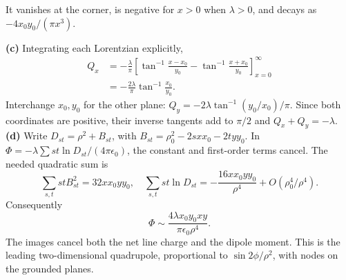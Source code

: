It vanishes at the corner, is negative for $x>0$ when $\lambda>0$,
and decays as $-4x_0y_0/(\pi x^3)$.
\begin{center}
\end{center}
\textbf{(c)} Integrating each Lorentzian explicitly,
\begin{align*}
Q_x&=-\frac\lambda\pi
 \left[\tan^{-1}\frac{x-x_0}{y_0}
       -\tan^{-1}\frac{x+x_0}{y_0}\right]_{x=0}^{\infty}\\
&=\boxed{-\frac{2\lambda}{\pi}\tan^{-1}\frac{x_0}{y_0}}.
\end{align*}
Interchange $x_0,y_0$ for the other plane:
$Q_y=-2\lambda\tan^{-1}(y_0/x_0)/\pi$.
Since both coordinates are positive, their inverse tangents add to
$\pi/2$ and $Q_x+Q_y=-\lambda$.
\textbf{(d)} Write $D_{st}=\rho^2+B_{st}$, with
$B_{st}=\rho_0^2-2sxx_0-2tyy_0$. In
$\Phi=-\lambda\sum st\ln D_{st}/(4\pi\epsilon _0)$,
the constant and first-order terms cancel. The needed quadratic sum is
\[
\sum_{s,t}st B_{st}^2=32xx_0yy_0,
\quad
\sum_{s,t}st\ln D_{st}=-\frac{16xx_0yy_0}{\rho^4}
 +O(\rho_0^4/\rho^4).
\]
Consequently
\[
\boxed{\Phi\sim\frac{4\lambda x_0y_0xy}{\pi\epsilon _0\rho^4}.}
\]
The images cancel both the net line charge and the dipole moment.
This is the leading two-dimensional quadrupole, proportional to
$\sin2\phi/\rho^2$, with nodes on the grounded planes.

